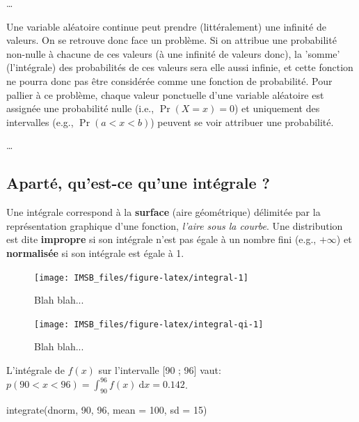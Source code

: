 \documentclass[
  a4paper,11pt,twoside,onecolumn,openright,final,oldfontcommands]{memoir}
\newenvironment{Shaded}{\begin{snugshade}}{\end{snugshade}}
\newcommand{\AttributeTok}[1]{\textcolor[rgb]{0.77,0.63,0.00}{#1}}
\newcommand{\DecValTok}[1]{\textcolor[rgb]{0.00,0.00,0.81}{#1}}
\newcommand{\FunctionTok}[1]{\textcolor[rgb]{0.00,0.00,0.00}{#1}}
\newcommand{\NormalTok}[1]{#1}
\theoremstyle{definition}
\theoremstyle{definition}
\theoremstyle{definition}
\theoremstyle{definition}
\theoremstyle{remark}
\begin{document}
\ldots{}

\begin{keyconcepts}{1.1}
Une variable aléatoire continue peut prendre (littéralement) une infinité de valeurs. On se retrouve donc face un problème. Si on attribue une probabilité non-nulle à chacune de ces valeurs (à une infinité de valeurs donc), la 'somme' (l'intégrale) des probabilités de ces valeurs sera elle aussi infinie, et cette fonction ne pourra donc pas être considérée comme une fonction de probabilité. Pour pallier à ce problème, chaque valeur ponctuelle d'une variable aléatoire est assignée une probabilité nulle (i.e., $\Pr(X = x) = 0$) et uniquement des intervalles (e.g., $\Pr(a < x < b)$) peuvent se voir attribuer une probabilité.
\end{keyconcepts}

\ldots{}

\hypertarget{apartuxe9-quest-ce-quune-intuxe9grale}{%
\subsection{Aparté, qu'est-ce qu'une intégrale ?}\label{apartuxe9-quest-ce-quune-intuxe9grale}}

Une intégrale correspond à la \textbf{surface} (aire géométrique) délimitée par la représentation graphique d'une fonction, \emph{l'aire sous la courbe}. Une distribution est dite \textbf{impropre} si son intégrale n'est pas égale à un nombre fini (e.g., \(+ \infty\)) et \textbf{normalisée} si son intégrale est égale à 1.

\begin{figure}[!htb]

{\centering \texttt{[image: IMSB\_files/figure-latex/integral-1]} 

}

\caption{Blah blah...}\label{fig:integral}
\end{figure}

\begin{figure}[!htb]

{\centering \texttt{[image: IMSB\_files/figure-latex/integral-qi-1]} 

}

\caption{Blah blah...}\label{fig:integral-qi}
\end{figure}

L'intégrale de \(f(x)\) sur l'intervalle {[}90 ; 96{]} vaut: \(p(90 < x < 96) = \int_{90}^{96} f(x) \ \mathrm{d}x = 0.142\).

\begin{Shaded}
\begin{Highlighting}[]
\FunctionTok{integrate}\NormalTok{(dnorm, }\DecValTok{90}\NormalTok{, }\DecValTok{96}\NormalTok{, }\AttributeTok{mean =} \DecValTok{100}\NormalTok{, }\AttributeTok{sd =} \DecValTok{15}\NormalTok{)}
\end{Highlighting}
\end{Shaded}
\end{document}
